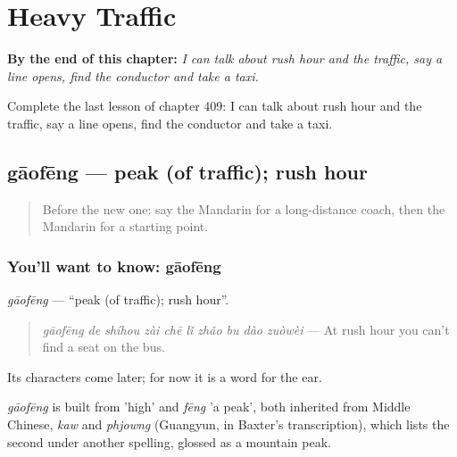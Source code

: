 
\chapter{Heavy Traffic}
\label{ch:zh-heavy-traffic}

\begin{chapteropening}
\textbf{By the end of this chapter:} \emph{I can talk about rush hour and the traffic, say a line opens, find the conductor and take a taxi.}

Complete the last lesson of chapter 409: I can talk about rush hour and the traffic, say a line opens, find the conductor and take a taxi.
\end{chapteropening}

\section[gāofēng]{gāofēng — peak (of traffic); rush hour}

\label{lesson:ZH-C409-gaofeng}



\begin{quote}
Before the new one: say the Mandarin for a long-distance coach, then the Mandarin for a starting point.
\end{quote}

\subsection*{You'll want to know: gāofēng}
\emph{gāofēng} — \textquotedblleft{}peak (of traffic); rush hour\textquotedblright{}.

\begin{quote}
\emph{gāofēng de shíhou zài chē lǐ zhǎo bu dào zuòwèi} — At rush hour you can't find a seat on the bus.
\end{quote}

Its characters come later; for now it is a word for the ear.

\begin{cousinweb}
\emph{gāofēng} is built from  'high' and \emph{fēng} 'a peak', both inherited from Middle Chinese, \emph{kaw} and \emph{phjowng} (Guangyun, in Baxter's transcription), which lists the second under another spelling, glossed as a mountain peak.
\end{cousinweb}

